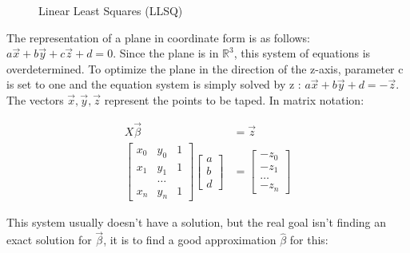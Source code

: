 \documentclass[11pt,oneside,openright]{mpreport}
\begin{document}
\begin{figure}[!ht]
\begin{center}
\caption{Linear Least Squares (LLSQ)}

\label{LLSQ_MIN}
\end{center}
\end{figure}


The representation of a plane in coordinate form is as follows: $ a\vec{x} + b\vec{y} + c\vec{z} + d = 0 $. Since the plane is in $\mathbb{R}^3$, this system of equations is overdetermined.
To optimize the plane in the direction of the z-axis, parameter c is set to one and the equation system is simply solved by z : $a\vec{x} + b\vec{y} + d = -\vec{z}$.
The vectors $\vec{x},\vec{y},\vec{z}$ represent the points to be taped.
In matrix notation:

\begin{align*}
X \vec{\beta} &= \vec{z}\\
\begin{bmatrix}
x_0 & y_0 & 1 \\
x_1 & y_1 & 1 \\
 & \dots & \\
x_n & y_n & 1 
\end{bmatrix} 
\begin{bmatrix}
a \\
b \\
d 
\end{bmatrix}
&= 
\begin{bmatrix}
-z_0 \\
-z_1 \\
\dots \\
-z_n 
\end{bmatrix} 
\end{align*}

This system usually doesn't have a solution, but the real goal isn't finding an exact solution for $\vec\beta$, it is to find a good approximation $\hat{\beta}$ for this:
\end{document}
